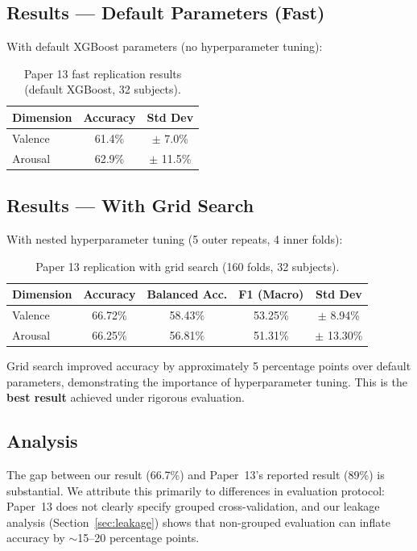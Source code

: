 \documentclass[12pt,a4paper]{report}
\begin{document}
\subsection{Results --- Default Parameters (Fast)}

With default XGBoost parameters (no hyperparameter tuning):

\begin{table}[H]
\centering
\caption{Paper 13 fast replication results (default XGBoost, 32 subjects).}
\label{tab:paper13_fast}
\begin{tabular}{lcc}
\toprule
\textbf{Dimension} & \textbf{Accuracy} & \textbf{Std Dev} \\
\midrule
Valence & 61.4\% & $\pm$ 7.0\% \\
Arousal & 62.9\% & $\pm$ 11.5\% \\
\bottomrule
\end{tabular}
\end{table}

\subsection{Results --- With Grid Search}

With nested hyperparameter tuning (5 outer repeats, 4 inner folds):

\begin{table}[H]
\centering
\caption{Paper 13 replication with grid search (160 folds, 32 subjects).}
\label{tab:paper13_grid}
\begin{tabular}{lcccc}
\toprule
\textbf{Dimension} & \textbf{Accuracy} & \textbf{Balanced Acc.} & \textbf{F1 (Macro)} & \textbf{Std Dev} \\
\midrule
Valence & 66.72\% & 58.43\% & 53.25\% & $\pm$ 8.94\% \\
Arousal & 66.25\% & 56.81\% & 51.31\% & $\pm$ 13.30\% \\
\bottomrule
\end{tabular}
\end{table}

Grid search improved accuracy by approximately 5 percentage points over
default parameters, demonstrating the importance of hyperparameter tuning.
This is the \textbf{best result} achieved under rigorous evaluation.

\subsection{Analysis}

The gap between our result (66.7\%) and Paper~13's reported result (89\%) is
substantial. We attribute this primarily to differences in evaluation
protocol: Paper~13 does not clearly specify grouped cross-validation, and
our leakage analysis (Section~\ref{sec:leakage}) shows that non-grouped
evaluation can inflate accuracy by $\sim$15--20 percentage points.
\end{document}
